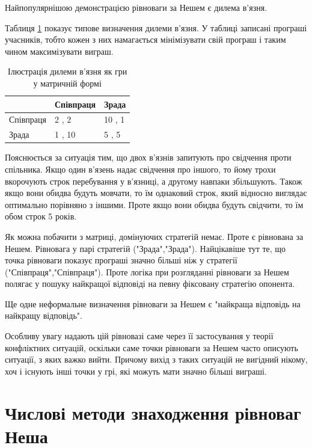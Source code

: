 Найпопулярнішою демонстрацією рівноваги за Нешем є дилема в'язня.

Таблиця \ref{table:prisoners_dillema} показує типове визначення дилеми в'язня. У таблиці записані програші учасників, тобто кожен з них намагається мінімізувати свій програш і таким чином максимізувати виграш.

\begin{table}[H]
	\caption{Ілюстрація дилеми в'язня як гри у матричній формі}
	\label{table:prisoners_dillema}
	\begin{center}
		\begin{tabular}{|l|l|l|}
			\hline
						& Співпраця & Зрада
			\\ \hline
			Співпраця 	& 2 , 2     & 10 , 1
			\\ \hline
			Зрада 		& 1 , 10    & 5 , 5
			\\ \hline
		\end{tabular}
	\end{center}
\end{table}

Пояснюється за ситуація тим, що двох в'язнів запитують про свідчення проти спільника. Якщо один в'язень надає свідчення про іншого, то йому трохи вкорочують строк перебування у в'язниці, а другому навпаки збільшують. Також якщо вони обидва будуть мовчати, то їм однаковий строк, який відносно виглядає оптимально порівняно з іншими. Проте якщо вони обидва будуть свідчити, то їм обом строк 5 років.

Як можна побачити з матриці, домінуючих стратегій немає. Проте є рівнована за Нешем. Рівновага у парі стратегій ("Зрада","Зрада"). Найцікавіше тут те, що точка рівноваги показує програші значно більші ніж у стратегії ("Співпраця","Співпраця"). Проте логіка при розгляданні рівноваги за Нешем полягає у пошуку найкращої відповіді на певну фіксовану стратегію опонента.

Ще одне неформальне визначення рівноваги за Нешем є "найкраща відповідь на найкращу відповідь".

Особливу увагу надають цій рівновазі саме через її застосування у теорії конфліктних ситуацій, оскільки саме точки рівноваги за Нешем часто описують ситуації, з яких важко вийти. Причому вихід з таких ситуацій не вигідний нікому, хоч і існують інші точки у грі, які можуть мати значно більші виграші.

\section{Числові методи знаходження рівноваг Неша}

